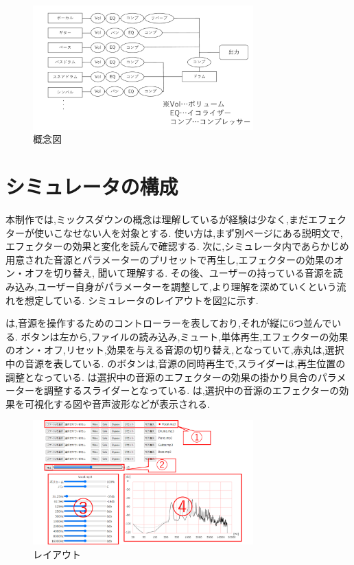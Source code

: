 \documentclass[twocolumn,10pt,a4j]{ltjsarticle}
\begin{document}
\begin{figure}[h]
\centering
 \includegraphics[width=85mm]{./figures/gainen.pdf}
 \caption{概念図}
 \label{fig:gainen}
\end{figure}

\section{シミュレータの構成}
本制作では,ミックスダウンの概念は理解しているが経験は少なく,まだエフェクターが使いこなせない人を対象とする.
使い方は,まず別ページにある説明文で,エフェクターの効果と変化を読んで確認する.
次に,シミュレータ内であらかじめ用意された音源とパラメーターのプリセットで再生し,エフェクターの効果のオン・オフを切り替え, 聞いて理解する.
その後、ユーザーの持っている音源を読み込み,ユーザー自身がパラメーターを調整して,より理解を深めていくという流れを想定している.
シミュレータのレイアウトを図\ref{fig:layout}に示す.

は,音源を操作するためのコントローラーを表しており,それが縦に6つ並んでいる.
ボタンは左から,ファイルの読み込み,ミュート,単体再生,エフェクターの効果のオン・オフ,リセット,効果を与える音源の切り替え,となっていて,赤丸は,選択中の音源を表している.
のボタンは,音源の同時再生で,スライダーは,再生位置の調整となっている.
は選択中の音源のエフェクターの効果の掛かり具合のパラメーターを調整するスライダーとなっている.
は,選択中の音源のエフェクターの効果を可視化する図や音声波形などが表示される.

\begin{figure}[h]
\centering
 \includegraphics[width=85mm]{./figures/layout.pdf}
 \caption{レイアウト}
 \label{fig:layout}
\end{figure}
\end{document}
